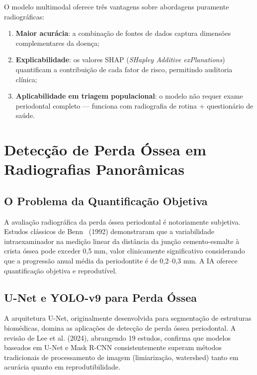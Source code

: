 O modelo multimodal oferece três vantagens sobre abordagens puramente radiográficas:
\begin{enumerate}
    \item \textbf{Maior acurácia}: a combinação de fontes de dados captura dimensões complementares da doença;
    \item \textbf{Explicabilidade}: os valores SHAP (\textit{SHapley Additive exPlanations}) quantificam a contribuição de cada fator de risco, permitindo auditoria clínica;
    \item \textbf{Aplicabilidade em triagem populacional}: o modelo não requer exame periodontal completo --- funciona com radiografia de rotina + questionário de saúde.
\end{enumerate}

\section{Detecção de Perda Óssea em Radiografias Panorâmicas}

\subsection{O Problema da Quantificação Objetiva}

A avaliação radiográfica da perda óssea periodontal é notoriamente subjetiva. Estudos clássicos de Benn~\cite{benn1992} (1992) demonstraram que a variabilidade intraexaminador na medição linear da distância da junção cemento-esmalte à crista óssea pode exceder 0,5 mm, valor clinicamente significativo considerando que a progressão anual média da periodontite é de 0,2--0,3 mm. A IA oferece quantificação objetiva e reprodutível.

\subsection{U-Net e YOLO-v9 para Perda Óssea}

A arquitetura U-Net, originalmente desenvolvida para segmentação de estruturas biomédicas, domina as aplicações de detecção de perda óssea periodontal. A revisão de Lee et al. (2024), abrangendo 19 estudos, confirma que modelos baseados em U-Net e Mask R-CNN consistentemente superam métodos tradicionais de processamento de imagem (limiarização, watershed) tanto em acurácia quanto em reprodutibilidade.

